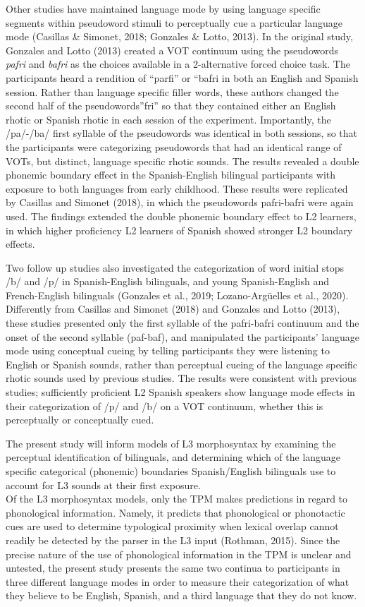 \documentclass[
  man]{apa6}
\begin{document}
Other studies have maintained language mode by using language specific segments within pseudoword stimuli to perceptually cue a particular language mode (Casillas \& Simonet, 2018; Gonzales \& Lotto, 2013). In the original study, Gonzales and Lotto (2013) created a VOT continuum using the pseudowords \emph{pafri} and \emph{bafri} as the choices available in a 2-alternative forced choice task. The participants heard a rendition of ``parfi'' or ``bafri in both an English and Spanish session. Rather than language specific filler words, these authors changed the second half of the pseudowords''fri'' so that they contained either an English rhotic or Spanish rhotic in each session of the experiment. Importantly, the /pa/-/ba/ first syllable of the pseudowords was identical in both sessions, so that the participants were categorizing pseudowords that had an identical range of VOTs, but distinct, language specific rhotic sounds. The results revealed a double phonemic boundary effect in the Spanish-English bilingual participants with exposure to both languages from early childhood. These results were replicated by Casillas and Simonet (2018), in which the pseudowords pafri-bafri were again used. The findings extended the double phonemic boundary effect to L2 learners, in which higher proficiency L2 learners of Spanish showed stronger L2 boundary effects.

Two follow up studies also investigated the categorization of word initial stops /b/ and /p/ in Spanish-English bilinguals, and young Spanish-English and French-English bilinguals (Gonzales et al., 2019; Lozano-Argüelles et al., 2020).
Differently from Casillas and Simonet (2018) and Gonzales and Lotto (2013), these studies presented only the first syllable of the pafri-bafri continuum and the onset of the second syllable (paf-baf), and manipulated the participants' language mode using conceptual cueing by telling participants they were listening to English or Spanish sounds, rather than perceptual cueing of the language specific rhotic sounds used by previous studies.
The results were consistent with previous studies; sufficiently proficient L2 Spanish speakers show language mode effects in their categorization of /p/ and /b/ on a VOT continuum, whether this is perceptually or conceptually cued.

The present study will inform models of L3 morphosyntax by examining the perceptual identification of bilinguals, and determining which of the language specific categorical (phonemic) boundaries Spanish/English bilinguals use to account for L3 sounds at their first exposure.\\
Of the L3 morphosyntax models, only the TPM makes predictions in regard to phonological information.
Namely, it predicts that phonological or phonotactic cues are used to determine typological proximity when lexical overlap cannot readily be detected by the parser in the L3 input (Rothman, 2015).
Since the precise nature of the use of phonological information in the TPM is unclear and untested, the present study presents the same two continua to participants in three different language modes in order to measure their categorization of what they believe to be English, Spanish, and a third language that they do not know.
\end{document}
